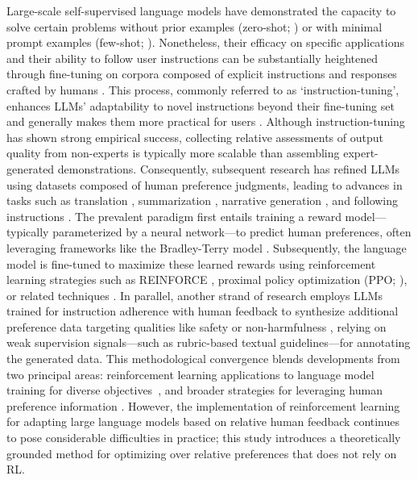 Large-scale self-supervised language models have demonstrated the capacity to solve certain problems without prior examples (zero-shot; \citep{radford2019language}) or with minimal prompt examples (few-shot; \citep{gpt3,megatron,chowdhery2022palm}). Nonetheless, their efficacy on specific applications and their ability to follow user instructions can be substantially heightened through fine-tuning on corpora composed of explicit instructions and responses crafted by humans \citep{mishra-etal-2022-cross,sanh2022multitask,chung2022scaling,thoppilan2022lamda}. This process, commonly referred to as ‘instruction-tuning’, enhances LLMs’ adaptability to novel instructions beyond their fine-tuning set and generally makes them more practical for users \citep{chung2022scaling}. Although instruction-tuning has shown strong empirical success, collecting relative assessments of output quality from non-experts is typically more scalable than assembling expert-generated demonstrations. Consequently, subsequent research has refined LLMs using datasets composed of human preference judgments, leading to advances in tasks such as translation \citep{kreutzer-etal-2018-reliability}, summarization \citep{stiennon2022learning,ziegler2020finetuning}, narrative generation \citep{ziegler2020finetuning}, and following instructions \citep{ouyang2022training,ramamurthy2023is}. The prevalent paradigm first entails training a reward model—typically parameterized by a neural network—to predict human preferences, often leveraging frameworks like the Bradley-Terry model \citep{bradley1952rankanalysis}. Subsequently, the language model is fine-tuned to maximize these learned rewards using reinforcement learning strategies such as REINFORCE \citep{williams1992reinforce}, proximal policy optimization (PPO; \cite{schulman2017proximal}), or related techniques \citep{ramamurthy2023is}. In parallel, another strand of research employs LLMs trained for instruction adherence with human feedback to synthesize additional preference data targeting qualities like safety or non-harmfulness \citep{bai2022constitutional}, relying on weak supervision signals—such as rubric-based textual guidelines—for annotating the generated data. This methodological convergence blends developments from two principal areas: reinforcement learning applications to language model training for diverse objectives~\citep{Ranzato2015SequenceLT,paulus2018a,wu2018learning}, and broader strategies for leveraging human preference information \citep{christiano2017deep,kupcsik2018learning}. However, the implementation of reinforcement learning for adapting large language models based on relative human feedback continues to pose considerable difficulties in practice; this study introduces a theoretically grounded method for optimizing over relative preferences that does not rely on RL.

